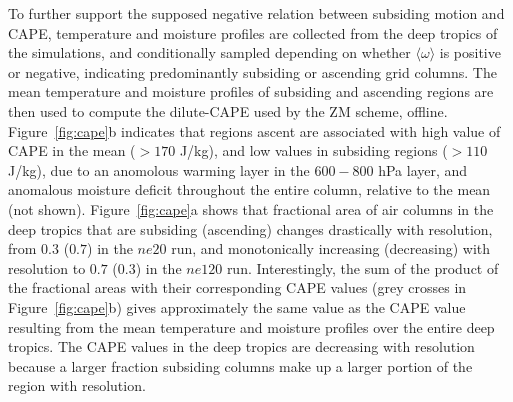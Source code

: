 {To further support the supposed negative relation between subsiding motion and CAPE, temperature and moisture profiles are collected from the deep tropics of the simulations, and conditionally sampled depending on whether $\langle \omega \rangle$ is positive or negative, indicating predominantly subsiding or ascending grid columns. The mean temperature and moisture profiles of subsiding and ascending regions are then used to compute the dilute-CAPE used by the ZM scheme, offline. Figure~\ref{fig:cape}b indicates that regions ascent are associated with high value of CAPE in the mean ($>170$ J/kg), and low values in subsiding regions ($>110$ J/kg), due to an anomolous warming layer in the $600-800$ hPa layer, and anomalous moisture deficit throughout the entire column, relative to the mean (not shown). Figure~\ref{fig:cape}a shows that fractional area of air columns in the deep tropics that are subsiding (ascending) changes drastically with resolution, from $0.3$ ($0.7$) in the $ne20$ run, and monotonically increasing (decreasing) with resolution to $0.7$ ($0.3$) in the $ne120$ run. Interestingly, the sum of the product of the fractional areas with their corresponding CAPE values (grey crosses in Figure~\ref{fig:cape}b) gives approximately the same value as the CAPE value resulting from the mean temperature and moisture profiles over the entire deep tropics. The CAPE values in the deep tropics are decreasing with resolution because a larger fraction subsiding columns make up a larger portion of the region with resolution.

}
